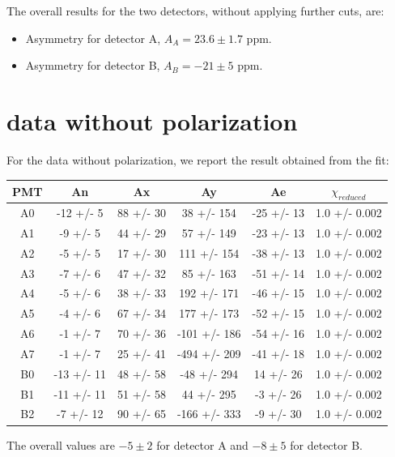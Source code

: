 The overall results for the two detectors, without applying further cuts, are: 
\begin{itemize}
\item Asymmetry for detector A, $A_{A} =  23.6 \pm 1.7$ ppm.
\item Asymmetry for detector B, $A_{B} = -21 \pm 5$ ppm.
\end{itemize}

\newpage
\section{data without polarization}

For the data without polarization, we report the result obtained from the fit:

\begin{table}[h]
\centering
\begin{tabular}{c|c|c|c|c|c}
\hline
 PMT   & An         & Ax        & Ay           & Ae         & $\chi _{reduced}$   \\
\hline
 A0    & -12 +/- 5  & 88 +/- 30 & 38 +/- 154   & -25 +/- 13 & 1.0 +/- 0.002   \\
 A1    & -9 +/- 5   & 44 +/- 29 & 57 +/- 149   & -23 +/- 13 & 1.0 +/- 0.002   \\
 A2    & -5 +/- 5   & 17 +/- 30 & 111 +/- 154  & -38 +/- 13 & 1.0 +/- 0.002   \\
 A3    & -7 +/- 6   & 47 +/- 32 & 85 +/- 163   & -51 +/- 14 & 1.0 +/- 0.002   \\
 A4    & -5 +/- 6   & 38 +/- 33 & 192 +/- 171  & -46 +/- 15 & 1.0 +/- 0.002   \\
 A5    & -4 +/- 6   & 67 +/- 34 & 177 +/- 173  & -52 +/- 15 & 1.0 +/- 0.002   \\
 A6    & -1 +/- 7   & 70 +/- 36 & -101 +/- 186 & -54 +/- 16 & 1.0 +/- 0.002   \\
 A7    & -1 +/- 7   & 25 +/- 41 & -494 +/- 209 & -41 +/- 18 & 1.0 +/- 0.002   \\
 B0    & -13 +/- 11 & 48 +/- 58 & -48 +/- 294  & 14 +/- 26  & 1.0 +/- 0.002   \\
 B1    & -11 +/- 11 & 51 +/- 58 & 44 +/- 295   & -3 +/- 26  & 1.0 +/- 0.002   \\
 B2    & -7 +/- 12  & 90 +/- 65 & -166 +/- 333 & -9 +/- 30  & 1.0 +/- 0.002   \\
\hline
\end{tabular}
\end{table}

The overall values are $-5 \pm 2$ for detector A and $-8 \pm 5$ for detector B.

